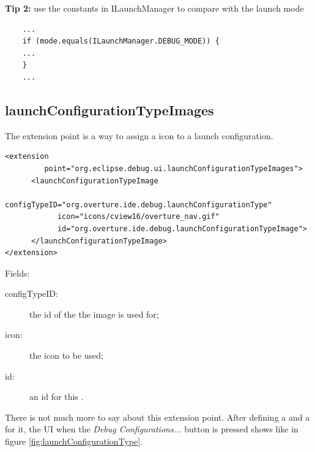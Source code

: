 \textbf{Tip 2:} use the constants in ILaunchManager to compare with the launch mode
\begin{lstlisting}
	...
	if (mode.equals(ILaunchManager.DEBUG_MODE)) {
	...
	}
	...
\end{lstlisting}



\subsection{launchConfigurationTypeImages}
The  extension point is a way to assign a icon to a launch configuration.


\lstset{language=XML, caption=launchConfigurationTypeImages extension point}
\begin{lstlisting}
<extension
         point="org.eclipse.debug.ui.launchConfigurationTypeImages">
      <launchConfigurationTypeImage
            configTypeID="org.overture.ide.debug.launchConfigurationType"
            icon="icons/cview16/overture_nav.gif"
            id="org.overture.ide.debug.launchConfigurationTypeImage">
      </launchConfigurationTypeImage>
</extension>
\end{lstlisting}




Fields:
\begin{description}
\item[configTypeID:] the id of the  the image is used for;
\item[icon:] the icon to be used;
\item[id:] an id for this .
\end{description}

There is not much more to say about this extension point. After defining a  and a   for it, the UI when the \textit{Debug Configurations...} button is pressed shows like in figure \ref{fig:launchConfigurationType}.

